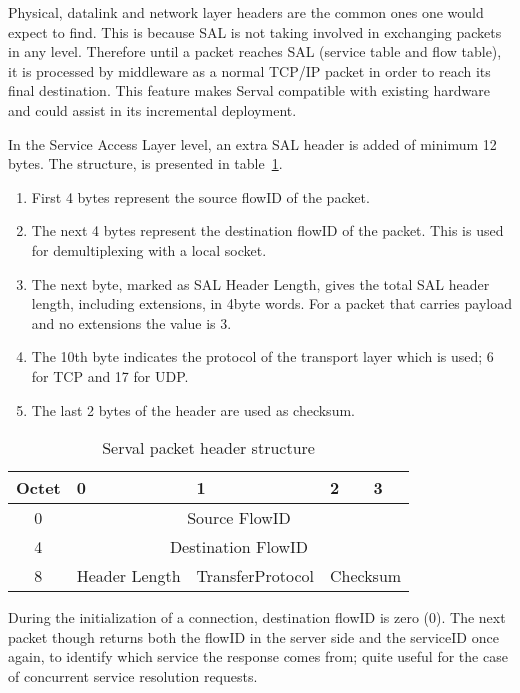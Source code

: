 Physical, datalink and network layer headers are the common ones one would expect to find.
This is because SAL is not taking involved in exchanging packets in any level.
Therefore until a packet reaches SAL (service table and flow table), it is processed by middleware as a normal TCP/IP packet in order to reach its final destination.
This feature makes Serval compatible with existing hardware and could assist in its incremental deployment.

In the Service Access Layer level, an extra SAL header is added of minimum 12 bytes.
The structure, is presented in table~\ref{table:salheader}.
\begin{enumerate} \itemsep1pt \parskip0pt 
  \item First 4 bytes represent the source flowID of the packet.
  \item The next 4 bytes represent the destination flowID of the packet.
  This is used for demultiplexing with a local socket.
  \item The next byte, marked as SAL Header Length, gives the total SAL header length, including extensions, in 4byte words.
  For a packet that carries payload and no extensions the value is 3.
  \item The 10th byte indicates the protocol of the transport layer which is used; 6 for TCP and 17 for UDP.
  \item The last 2 bytes of the header are used as checksum.
\end{enumerate}

\begin{table}
\begin{center}
  \begin{tabularx}{\linewidth}{|c|X|X|X|X|}
  	\hline
  	Octet &	0 & 1 & 2 & 3 \\ \hline
  	0 & \multicolumn{4}{c|}{Source FlowID}\\ \hline
  	4 & \multicolumn{4}{c|}{Destination FlowID}\\ \hline
  	8 &	Header Length & {Transfer\linebreak Protocol} &	\multicolumn{2}{|c|}{Checksum}	\\
	\hline
  \end{tabularx}
  \caption[Serval packet header structure]{Serval packet header structure}
  \label{table:salheader}
\end{center}
\end{table}

During the initialization of a connection, destination flowID is zero (0).
The next packet though returns both the flowID in the server side and the serviceID once again, to identify which service the response comes from; quite useful for the case of concurrent service resolution requests.

